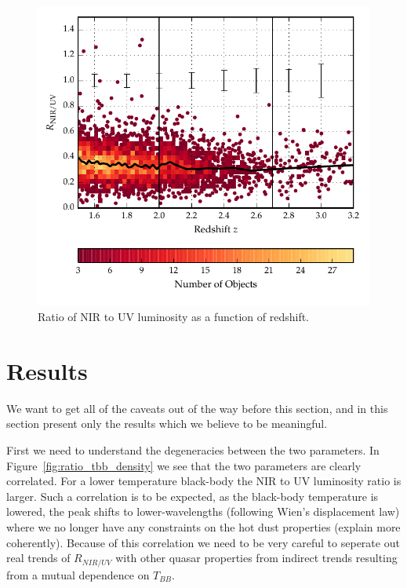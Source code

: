 \begin{figure}
  \centering
  \includegraphics[width=\textwidth]{figures/chapter06/ratio_z_errors_highz.pdf}
  \caption{Ratio of NIR to UV luminosity as a function of redshift.}
  \label{fig:}
\end{figure}


\section{Results}

We want to get all of the caveats out of the way before this section, and in this section present only the results which we believe to be meaningful. 

First we need to understand the degeneracies between the two parameters. 
In Figure~\ref{fig:ratio_tbb_density} we see that the two parameters are clearly correlated. 
For a lower temperature black-body the NIR to UV luminosity ratio is larger. 
Such a correlation is to be expected, as the black-body temperature is lowered, the peak shifts to lower-wavelengths (following Wien's displacement law) where we no longer have any constraints on the hot dust properties (explain more coherently). 
Because of this correlation we need to be very careful to seperate out real trends of $R_{NIR/UV}$ with other quasar properties from indirect trends resulting from a mutual dependence on $T_{BB}$.  

